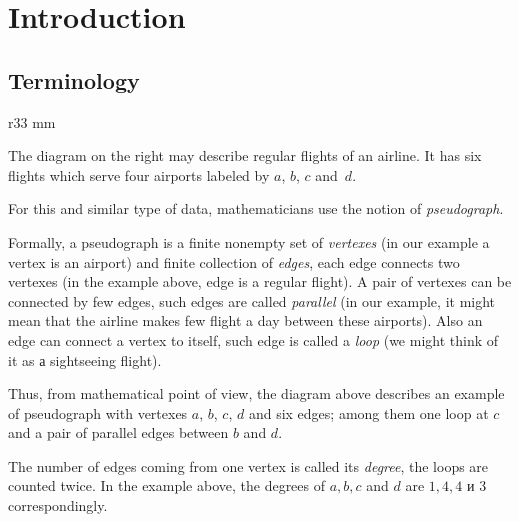 \chapter{Introduction}
\section*{Terminology}

\begin{wrapfigure}{r}{33 mm}
\end{wrapfigure}

The diagram on the right may describe regular flights of an airline.
It has six flights which serve four airports labeled by $a$, $b$, $c$ and~$d$.

For this and similar type of data, mathematicians use the notion of \emph{pseudograph}.

Formally, a pseudograph is a finite nonempty set of \emph{vertexes}  (in our example a vertex is an airport) 
and finite collection of \emph{edges}, each edge connects two vertexes (in the example above, edge is a regular flight).
A pair of vertexes can be connected by few edges, such edges are called \emph{parallel} (in our example, it might mean that the airline makes few  flight a day between these airports). 
Also an edge can connect a vertex to itself, such edge is called a \emph{loop} (we might think of it as а sightseeing flight).

Thus, from mathematical point of view, the diagram above describes an example of pseudograph with vertexes $a$, $b$, $c$, $d$ and 
six edges; among them one loop at $c$ and a pair of parallel edges between $b$ and $d$.

\smallskip

The number of edges coming from one vertex is called its \emph{degree}, the loops are counted twice.
In the example above,
the degrees of $a,b,c$ and $d$ are $1,4,4$ и $3$ correspondingly.


